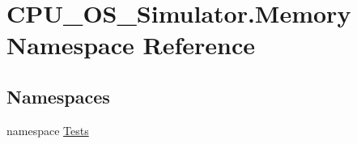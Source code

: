 \hypertarget{namespace_c_p_u___o_s___simulator_1_1_memory}{}\section{C\+P\+U\+\_\+\+O\+S\+\_\+\+Simulator.\+Memory Namespace Reference}
\label{namespace_c_p_u___o_s___simulator_1_1_memory}
\subsection*{Namespaces}
\begin{DoxyCompactItemize}
\item 
namespace \hyperlink{namespace_c_p_u___o_s___simulator_1_1_memory_1_1_tests}{Tests}
\end{DoxyCompactItemize}
